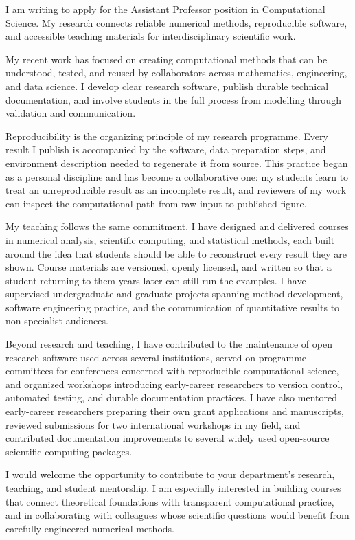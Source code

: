 \documentclass[family=academic, medium=print]{careerdossier-letter}
\providecommand\CDossierAFourContinuationStress{}
\begin{document}
\MakeCDossierLetterhead

I am writing to apply for the Assistant Professor position in Computational
Science. My research connects reliable numerical methods, reproducible software,
and accessible teaching materials for interdisciplinary scientific work.

My recent work has focused on creating computational methods that can be
understood, tested, and reused by collaborators across mathematics, engineering,
and data science. I develop clear research software, publish durable technical
documentation, and involve students in the full process from modelling through
validation and communication.

Reproducibility is the organizing principle of my research programme. Every
result I publish is accompanied by the software, data preparation steps, and
environment description needed to regenerate it from source. This practice began
as a personal discipline and has become a collaborative one: my students learn to
treat an unreproducible result as an incomplete result, and reviewers of my work
can inspect the computational path from raw input to published figure.

My teaching follows the same commitment. I have designed and delivered courses in
numerical analysis, scientific computing, and statistical methods, each built
around the idea that students should be able to reconstruct every result they are
shown. Course materials are versioned, openly licensed, and written so that a
student returning to them years later can still run the examples. I have
supervised undergraduate and graduate projects spanning method development,
software engineering practice, and the communication of quantitative results to
non-specialist audiences.

Beyond research and teaching, I have contributed to the maintenance of open
research software used across several institutions, served on programme
committees for conferences concerned with reproducible computational science, and
organized workshops introducing early-career researchers to version control,
automated testing, and durable documentation practices. I have also mentored
early-career researchers preparing their own grant applications and manuscripts,
reviewed submissions for two international workshops in my field, and
contributed documentation improvements to several widely used open-source
scientific computing packages.

I would welcome the opportunity to contribute to your department's research,
teaching, and student mentorship. I am especially interested in building courses
that connect theoretical foundations with transparent computational practice, and
in collaborating with colleagues whose scientific questions would benefit from
carefully engineered numerical methods.

\CDossierAFourContinuationStress

\MakeCDossierClosing
\end{document}
